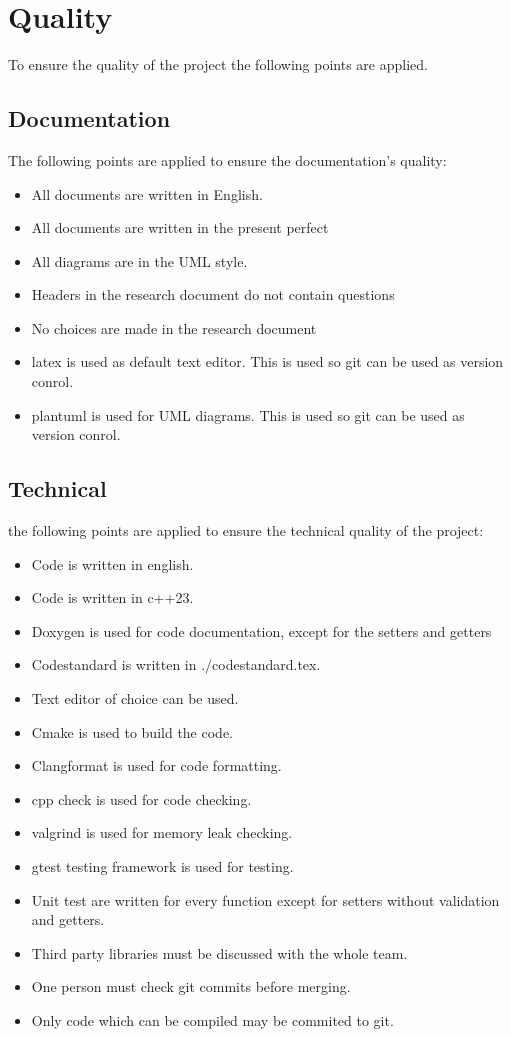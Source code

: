 \documentclass{article} %
\begin{document}
\newpage

\section{Quality}
To ensure the quality of the project the following points are applied.
\subsection{Documentation}
The following points are applied to ensure the documentation’s quality:
\begin{itemize}
    \item All documents are written in English.
    \item All documents are written in the present perfect
    \item All diagrams are in the UML style.
    \item Headers in the research document do not contain questions
    \item No choices are made in the research document
    \item latex is used as default text editor. This is used so git can be used as version conrol.
    \item plantuml is used for UML diagrams. This is used so git can be used as version conrol.
\end{itemize}
\subsection{Technical}
the following points are applied to ensure the technical quality of the project:
\begin{itemize}
    \item Code is written in english.
    \item Code is written in c++23.
    \item Doxygen is used for code documentation, except for the setters and getters
    \item Codestandard is written in ./codestandard.tex.
    \item Text editor of choice can be used.
    \item Cmake is used to build the code.
    \item Clangformat is used for code formatting.
    \item cpp check is used for code checking.
    \item valgrind is used for memory leak checking.
    \item gtest testing framework is used for testing.
    \item Unit test are written for every function except for setters without validation and getters.
    \item Third party libraries must be discussed with the whole team.
    \item One person must check git commits before merging.
    \item Only code which can be compiled may be commited to git.
\end{itemize}
\end{document}
